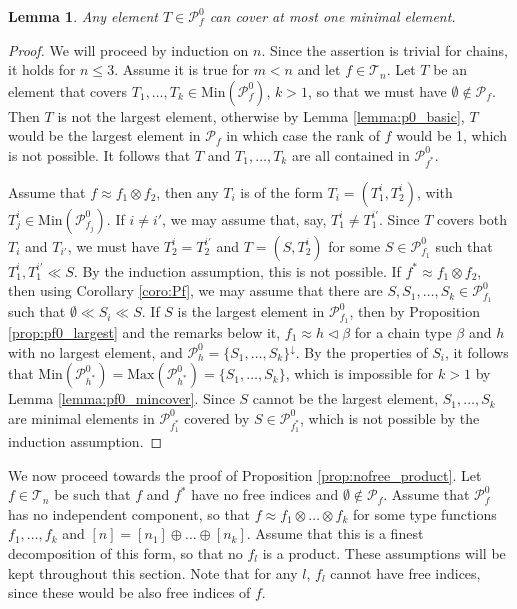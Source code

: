 \documentclass[12pt]{article}
\newtheorem{lemma}{Lemma}
\theoremstyle{definition}
\theoremstyle{remark}
\def\cover{\ll}
\def\Te{\mathcal T}
\def\Pe{\mathcal P}
\def\vtl{\vartriangleleft}
\begin{document}
\begin{lemma}\label{lemma:pf0_covermin} Any element $T\in \Pe_f^0$ can cover at most one
minimal element. 

\end{lemma}

\begin{proof} We will proceed by induction on $n$. Since the assertion is trivial for
chains, it holds for $n\le 3$. Assume it is true for $m<n$ and let $f\in \Te_n$. Let
$T$ be an element that covers $T_1,\dots, T_k\in \mathrm{Min}(\Pe^0_f)$, $k>1$, so that we must have  $\emptyset \notin \Pe_f$. 
Then  $T$ is not the largest element, otherwise by Lemma \ref{lemma:p0_basic}, $T$ would
be the largest element in $\Pe_f$ in which case the rank of $f$ would be 1, which is not
possible. It follows that  $T$  and $T_1,\dots,
T_k$ are all contained in $\Pe_{f^*}^0$. 

Assume that $f\approx f_1\otimes f_2$, then any $T_i$ is of the form
$T_i=(T^i_1,T^i_2)$, with $T^i_j\in \mathrm{Min}(\Pe_{f_j}^0)$.  If $i\ne i'$, we may
assume that, say, $T^i_1\ne T^{i'}_1$. Since $T$ covers both $T_i$ and $T_{i'}$, we must
have $T^i_2=T^{i'}_2$ and $T=(S,T^i_2)$ for some $S\in \Pe_{f_1}^0$ such that
$T^i_1,T^{i'}_1\cover S$. By the induction assumption, this is not possible. 
If $f^*\approx f_1\otimes f_2$, then using Corollary \ref{coro:Pf}, we may assume that there are
$S, S_1,\dots,S_k\in \Pe_{f_1}^0$ such that $\emptyset \cover S_i \cover S$. If $S$ is the
largest element in $\Pe_{f_1}^0$, 
then by Proposition \ref{prop:pf0_largest} and the remarks below it, $f_1\approx h\vtl\beta$ for a chain type $\beta$
and $h$ with no largest element, and $\Pe_h^0=\{S_1,\dots, S_k\}^\downarrow$. By the
properties of $S_i$, it follows that
$\mathrm{Min}(\Pe_{h^*}^0)=\mathrm{Max}(\Pe_{h^*}^0)=\{S_1,\dots,S_k\}$, which is
impossible for $k>1$ by Lemma \ref{lemma:pf0_mincover}. Since $S$ cannot be the largest
element, $S_1,\dots,S_k$ are minimal elements in $\Pe_{f_1^*}^0$ covered by $S\in
\Pe_{f_1^*}^0$, which is not possible by the induction assumption.


\end{proof}


We now proceed towards the proof of Proposition \ref{prop:nofree_product}. 
Let $f\in \Te_n$ be such that $f$ and $f^*$ have no free indices and  $\emptyset\notin \Pe_f$. Assume that
$\Pe_f^0$ has no independent component, so that $f\approx f_1\otimes \dots \otimes f_k$ for some
type functions $f_1,\dots,f_k$ and $[n]=[n_1]\oplus\dots\oplus [n_k]$. Assume that this is a finest  decomposition
of this form, so that no $f_l$ is a product.  These assumptions will be kept throughout
this section. Note that for any $l$, $f_l$ cannot have free indices, since
these would be also free indices of $f$. 
\end{document}
